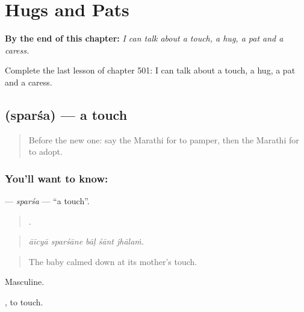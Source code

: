 
\chapter{Hugs and Pats}
\label{ch:mr-hugs-and-pats}

\begin{chapteropening}
\textbf{By the end of this chapter:} \emph{I can talk about a touch, a hug, a pat and a caress.}

Complete the last lesson of chapter 501: I can talk about a touch, a hug, a pat and a caress.
\end{chapteropening}

\section[\texorpdfstring{\mr{स्पर्श} (sparśa)}{स्पर्श (sparśa)}]{ (sparśa) — a touch}

\label{lesson:MR-C501-sparsa}



\begin{quote}
Before the new one: say the Marathi for to pamper, then the Marathi for to adopt.
\end{quote}

\subsection*{You'll want to know: }
\textbf{} — \emph{sparśa} — \textquotedblleft{}a touch\textquotedblright{}.

\begin{quote}
    .
\end{quote}

\begin{quote}
\emph{āīcyā sparśāne bāḷ śānt jhālaṁ.}
\end{quote}

\begin{quote}
The baby calmed down at its mother's touch.
\end{quote}

Masculine.

 , to touch.


